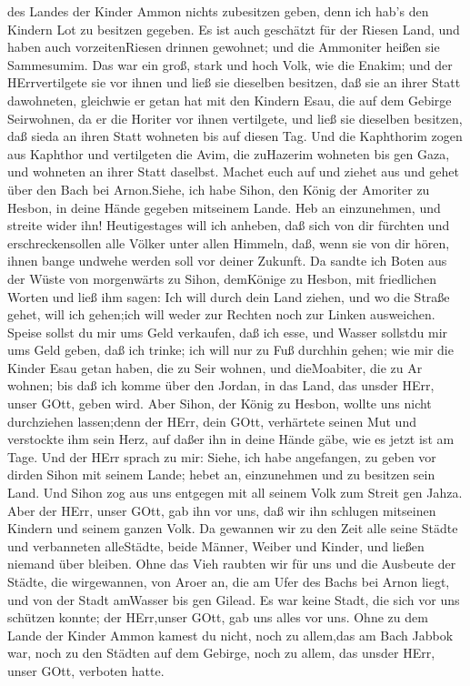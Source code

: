des Landes der Kinder Ammon nichts zubesitzen geben, denn ich hab's den
Kindern Lot zu besitzen gegeben.  Es ist auch geschätzt für
der Riesen Land, und haben auch vorzeitenRiesen drinnen gewohnet; und
die Ammoniter heißen sie Sammesumim.  Das war ein groß,
stark und hoch Volk, wie die Enakim; und der HErrvertilgete sie vor
ihnen und ließ sie dieselben besitzen, daß sie an ihrer Statt
dawohneten,  gleichwie er getan hat mit den Kindern Esau,
die auf dem Gebirge Seirwohnen, da er die Horiter vor ihnen vertilgete,
und ließ sie dieselben besitzen, daß sieda an ihren Statt wohneten bis
auf diesen Tag.  Und die Kaphthorim zogen aus Kaphthor und
vertilgeten die Avim, die zuHazerim wohneten bis gen Gaza, und wohneten
an ihrer Statt daselbst.  Machet euch auf und ziehet aus
und gehet über den Bach bei Arnon.Siehe, ich habe Sihon, den König der
Amoriter zu Hesbon, in deine Hände gegeben mitseinem Lande. Heb an
einzunehmen, und streite wider ihn!  Heutigestages will ich
anheben, daß sich von dir fürchten und erschreckensollen alle Völker
unter allen Himmeln, daß, wenn sie von dir hören, ihnen bange undwehe
werden soll vor deiner Zukunft.  Da sandte ich Boten aus
der Wüste von morgenwärts zu Sihon, demKönige zu Hesbon, mit friedlichen
Worten und ließ ihm sagen:  Ich will durch dein Land
ziehen, und wo die Straße gehet, will ich gehen;ich will weder zur
Rechten noch zur Linken ausweichen.  Speise sollst du mir
ums Geld verkaufen, daß ich esse, und Wasser sollstdu mir ums Geld
geben, daß ich trinke; ich will nur zu Fuß durchhin gehen; 
wie mir die Kinder Esau getan haben, die zu Seir wohnen, und
dieMoabiter, die zu Ar wohnen; bis daß ich komme über den Jordan, in das
Land, das unsder HErr, unser GOtt, geben wird.  Aber Sihon,
der König zu Hesbon, wollte uns nicht durchziehen lassen;denn der HErr,
dein GOtt, verhärtete seinen Mut und verstockte ihm sein Herz, auf daßer
ihn in deine Hände gäbe, wie es jetzt ist am Tage.  Und der
HErr sprach zu mir: Siehe, ich habe angefangen, zu geben vor dirden
Sihon mit seinem Lande; hebet an, einzunehmen und zu besitzen sein Land.
 Und Sihon zog aus uns entgegen mit all seinem Volk zum
Streit gen Jahza.  Aber der HErr, unser GOtt, gab ihn vor
uns, daß wir ihn schlugen mitseinen Kindern und seinem ganzen Volk.
 Da gewannen wir zu den Zeit alle seine Städte und
verbanneten alleStädte, beide Männer, Weiber und Kinder, und ließen
niemand über bleiben.  Ohne das Vieh raubten wir für uns
und die Ausbeute der Städte, die wirgewannen,  von Aroer
an, die am Ufer des Bachs bei Arnon liegt, und von der Stadt amWasser
bis gen Gilead. Es war keine Stadt, die sich vor uns schützen konnte;
der HErr,unser GOtt, gab uns alles vor uns.  Ohne zu dem
Lande der Kinder Ammon kamest du nicht, noch zu allem,das am Bach Jabbok
war, noch zu den Städten auf dem Gebirge, noch zu allem, das unsder
HErr, unser GOtt, verboten hatte.

